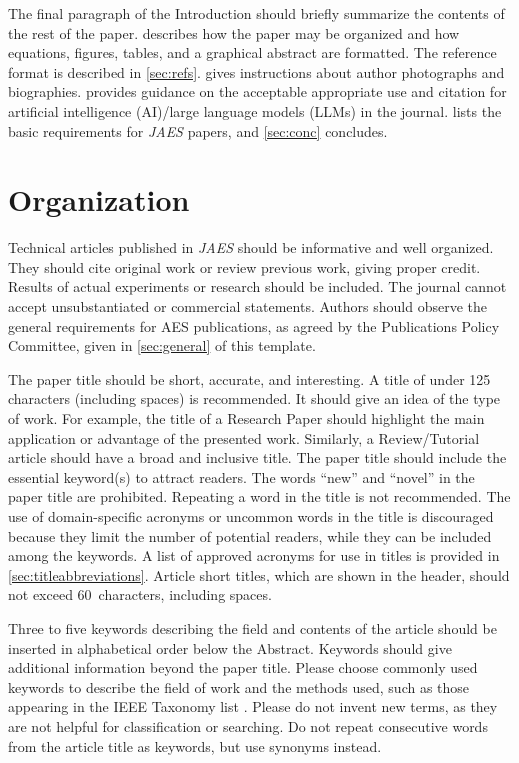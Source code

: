 \documentclass[fleqn]{jaes}
\begin{document}
The final paragraph of the Introduction should briefly summarize the contents of the rest of the paper.  describes how the paper may be organized and how equations, figures, tables, and a graphical abstract are formatted. The reference format is described in \cref{sec:refs}.  gives instructions about author photographs and biographies.  provides guidance on the acceptable appropriate use and citation for artificial intelligence (AI)/large language models (LLMs) in the journal.  lists the basic requirements for \emph{JAES} papers, and \cref{sec:conc} concludes. 

\section{Organization}{\label{sec:org}}

Technical articles published in \emph{JAES} should be informative and well organized. They should cite original work or review previous work, giving proper credit. Results of actual experiments or research should be included. The journal cannot accept unsubstantiated or commercial statements. Authors should observe the general requirements for AES publications, as agreed by the Publications Policy Committee, given in \cref{sec:general} of this template.

The paper title should be short, accurate, and interesting. A title of under 125 characters (including spaces) is recommended. It should give an idea of the type of work. For example, the title of a Research Paper should highlight the main application or advantage of the presented work. Similarly, a Review/Tutorial article should have a broad and inclusive title. The paper title should include the essential keyword(s) to attract readers. The words “new” and “novel” in the paper title are prohibited. Repeating a word in the title is not recommended.
The use of domain-specific acronyms or uncommon words in the title is discouraged because they limit the number of potential readers, while they can be included among the keywords. A list of approved acronyms for use in titles is provided in \cref{sec:titleabbreviations}. Article short titles, which are shown in the header, should not exceed 60~characters, including spaces.

Three to five keywords describing the field and contents of the article should be inserted in alphabetical order below the Abstract. Keywords should give additional information beyond the paper title. Please choose commonly used keywords to describe the field of work and the methods used, such as those appearing in the IEEE Taxonomy list \cite{ieee-taxonomy}. Please do not invent new terms, as they are not helpful for classification or searching. Do not repeat consecutive words from the article title as keywords, but use synonyms instead. 
\end{document}
